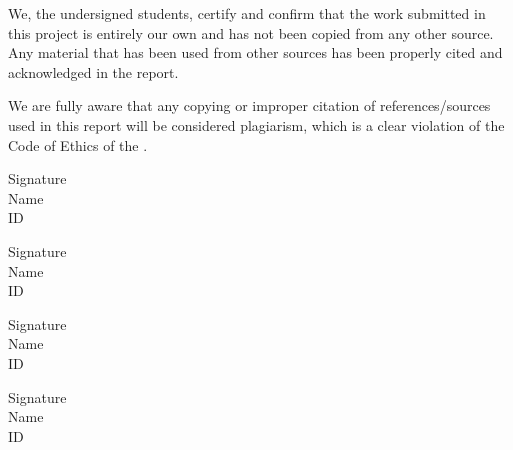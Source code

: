 \studentstatement
We, the undersigned students, certify and confirm that the work submitted in this project is entirely our own and has not been copied from any other source.
Any material that has been used from other sources has been properly cited and acknowledged in the report.

We are fully aware that any copying or improper citation of references/sources used in this report will be considered plagiarism, which is a clear violation of the Code of Ethics of the \uni.

\vfill

\hspace*{\fill}
\begin{minipage}{0.3\textwidth}
  \centering
  \hrulefill\vskip1cm Signature \vskip1cm\hrulefill\\%
  Name\\ID
\end{minipage}\hspace*{\fill}
\begin{minipage}{0.3\textwidth}
  \centering
  \hrulefill\vskip1cm Signature \vskip1cm\hrulefill\\
  Name\\ID
\end{minipage}\hspace*{\fill}
\baselineskip
\hspace*{\fill}
\begin{minipage}{0.3\textwidth}
  \centering
  \hrulefill\vskip1cm Signature \vskip1cm\hrulefill\\
  Name\\ID
\end{minipage}\hspace*{\fill}
\begin{minipage}{0.3\textwidth}
  \centering
  \hrulefill\vskip1cm Signature \vskip1cm\hrulefill\\
    Name\\ID
  \end{minipage}\hspace*{\fill}
